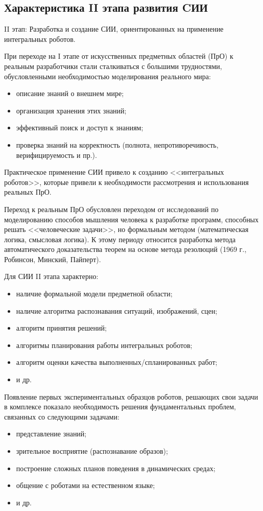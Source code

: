 \subsection{Характеристика II этапа развития CИИ}
II этап: Разработка и создание СИИ, ориентированных на применение
интегральных роботов.

При переходе на I этапе от искусственных предметных областей (ПрО) к
реальным разработчики стали сталкиваться с большими трудностями,
обусловленными необходимостью моделирования реального мира:
\begin{itemize}
\item описание знаний о внешнем мире;
\item организация хранения этих знаний;
\item эффективный поиск и доступ к знаниям;
\item проверка знаний на корректность (полнота, непротиворечивость,
  верифицируемость и пр.).
\end{itemize}

Практическое применение СИИ привело к созданию <<интегральных
роботов>>, которые привели к необходимости рассмотрения и
использования реальных ПрО.

Переход к реальным ПрО обусловлен переходом от исследований по
моделированию способов мышления человека к разработке программ,
способных решать <<человеческие задачи>>, но формальным методом
(математическая логика, смысловая логика). К этому периоду относится
разработка метода автоматического доказательства теорем на основе
метода резолюций (1969 г., Робинсон, Минский, Пайперт).

Для СИИ II этапа характерно:
\begin{itemize}
\item наличие формальной модели предметной области;
\item наличие алгоритма распознавания ситуаций, изображений, сцен;
\item алгоритм принятия решений;
\item алгоритмы планирования работы интегральных роботов;
\item алгоритм оценки качества выполненных/спланированных работ;
\item и др.
\end{itemize}

Появление первых экспериментальных образцов роботов, решающих свои
задачи в комплексе показало необходимость решения фундаментальных
проблем, связанных со следующими задачами:
\begin{itemize}
\item представление знаний;
\item зрительное восприятие (распознавание образов);
\item построение сложных планов поведения в динамических средах;
\item общение с роботами на естественном языке;
\item и др.
\end{itemize}

